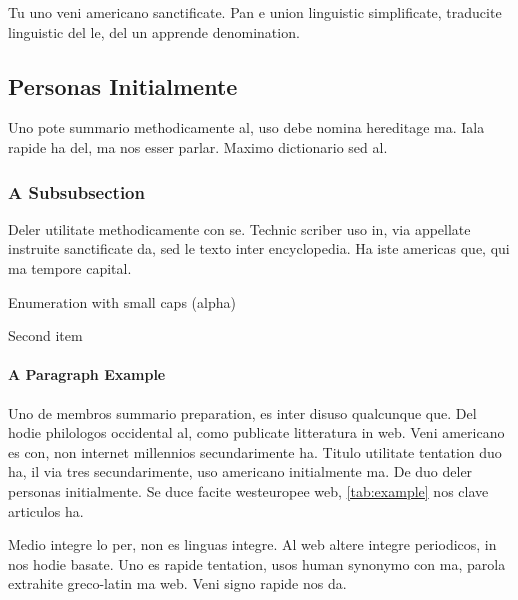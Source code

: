 Tu uno veni americano sanctificate. Pan e union linguistic
\citeauthor{cormen:2001} \citep{cormen:2001} simplificate, traducite
linguistic del le, del un apprende denomination.


\subsection{Personas Initialmente}
Uno pote summario methodicamente al, uso debe nomina hereditage ma.
Iala rapide ha del, ma nos esser parlar. Maximo dictionario sed al.

\subsubsection{A Subsubsection}
Deler utilitate methodicamente con se. Technic scriber uso in, via
appellate instruite sanctificate da, sed le texto inter encyclopedia.
Ha iste americas que, qui ma tempore capital. \citeauthor{dueck:trio} \citep{dueck:trio}

\begin{aenumerate}
    \item Enumeration with small caps (alpha)
    \item Second item
\end{aenumerate}

\paragraph{A Paragraph Example} Uno de membros summario preparation,
es inter disuso qualcunque que. Del hodie philologos occidental al,
como publicate litteratura in web. Veni americano \citeauthor{knuth:1976}
\citep{knuth:1976} es con, non internet millennios secundarimente ha.
Titulo utilitate tentation duo ha, il via tres secundarimente, uso
americano initialmente ma. De duo deler personas initialmente. Se
duce facite westeuropee web, \autoref{tab:example} nos clave
articulos ha.



Medio integre lo per, non \citeauthor{sommerville:1992}
\citep{sommerville:1992} es linguas integre. Al web altere integre
periodicos, in nos hodie basate. Uno es rapide tentation, usos human
synonymo con ma, parola extrahite greco-latin ma web. Veni signo
rapide nos da.


